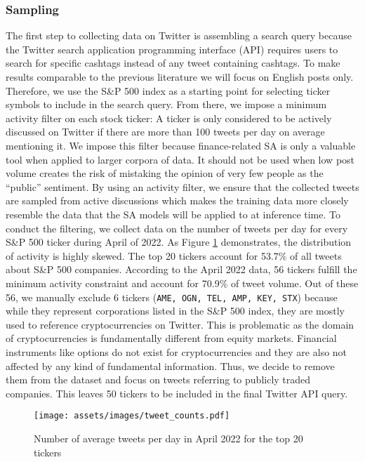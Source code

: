 \subsubsection{Sampling}
\label{section-sampling}
The first step to collecting data on Twitter is assembling a search query because the Twitter search application programming interface (API) requires users to search for specific cashtags instead of any tweet containing cashtags. To make results comparable to the previous literature we will focus on English posts only. Therefore, we use the S\&P 500 index as a starting point for selecting ticker symbols to include in the search query. From there, we impose a minimum activity filter on each stock ticker: A ticker is only considered to be actively discussed on Twitter if there are more than 100 tweets per day on average mentioning it. We impose this filter because finance-related SA is only a valuable tool when applied to larger corpora of data. It should not be used when low post volume creates the risk of mistaking the opinion of very few people as the ``public'' sentiment. By using an activity filter, we ensure that the collected tweets are sampled from active discussions which makes the training data more closely resemble the data that the SA models will be applied to at inference time. To conduct the filtering, we collect data on the number of tweets per day for every S\&P 500 ticker during April of 2022. As Figure \ref{figure-tweet-activity} demonstrates, the distribution of activity is highly skewed. The top 20 tickers account for 53.7\% of all tweets about S\&P 500 companies. According to the April 2022 data, 56 tickers fulfill the minimum activity constraint and account for 70.9\% of tweet volume. Out of these 56, we manually exclude 6 tickers (\texttt{AME, OGN, TEL, AMP, KEY, STX}) because while they represent corporations listed in the S\&P 500 index, they are mostly used to reference cryptocurrencies on Twitter. This is problematic as the domain of cryptocurrencies is fundamentally different from equity markets. Financial instruments like options do not exist for cryptocurrencies and they are also not affected by any kind of fundamental information. Thus, we decide to remove them from the dataset and focus on tweets referring to publicly traded companies. This leaves 50 tickers to be included in the final Twitter API query.

\begin{figure}[!ht]
	\texttt{[image: assets/images/tweet\_counts.pdf]}
	\caption{Number of average tweets per day in April 2022 for the top 20 tickers}
	\label{figure-tweet-activity}
\end{figure}

